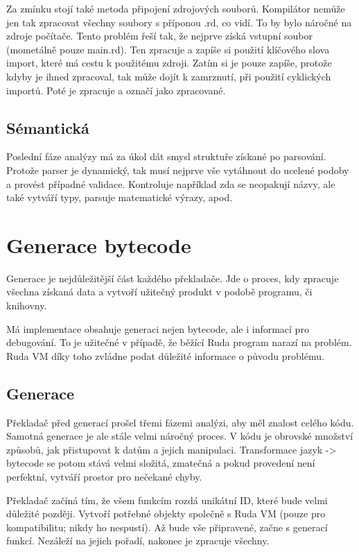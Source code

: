 \documentclass[12pt, a4paper,
twoside,        %
openright
]{report}
\begin{document}
Za zmínku stojí také metoda připojení zdrojových souborů. Kompilátor nemůže jen tak zpracovat všechny soubory s příponou .rd, co vidí. To by bylo náročné na zdroje počítače. Tento problém řeší tak, že nejprve získá vstupní soubor (mometálně pouze main.rd). Ten zpracuje a zapíše si použití klíčového slova import, které má cestu k použitému zdroji. Zatím si je pouze zapíše, protože kdyby je ihned zpracoval, tak může dojít k zamrznutí, při použití cyklických importů. Poté je zpracuje a označí jako zpracované.

\cleardoublepage


\subsection{Sémantická}

Poslední fáze analýzy má za úkol dát smysl struktuře získané po parsování. Protože parser je dynamický, tak musí nejprve vše vytáhnout do ucelené podoby a provést případné validace. Kontroluje například zda se neopakují názvy, ale také vytváří typy, parsuje matematické výrazy, apod.


\section{Generace bytecode}

Generace je nejdůležitější část každého překladače. Jde o proces, kdy zpracuje všechna získaná data a vytvoří užitečný produkt v podobě programu, či knihovny.

Má implementace obsahuje generaci nejen bytecode, ale i informací pro debugování. To je užitečné v případě, že běžící Ruda program narazí na problém. Ruda VM díky toho zvládne podat důležité informace o původu problému.

\subsection{Generace}

Překladač před generací prošel třemi fázemi analýzi, aby měl znalost celého kódu. Samotná generace je ale stále velmi náročný proces. V kódu je obrovské množství způsobů, jak přistupovat k datům a jejich manipulaci. Transformace jazyk -> bytecode se potom stává velmi složitá, zmatečná a pokud provedení není perfektní, vytváří prostor pro nečekané chyby.

Překladač začíná tím, že všem funkcím rozdá unikátní ID, které bude velmi důležité později. Vytvoří potřebné objekty společně s Ruda VM (pouze pro kompatibilitu; nikdy ho nespustí). Až bude vše připravené, začne s generací funkcí. Nezáleží na jejich pořadí, nakonec je zpracuje všechny.
\end{document}
